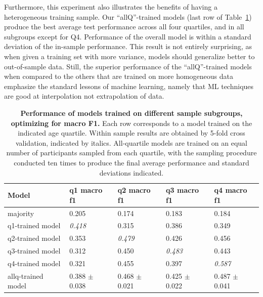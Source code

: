 \documentclass[acmlarge]{acmart}
\begin{document}
Furthermore, this experiment also illustrates the benefits of having a heterogeneous training sample. Our ``allQ''-trained models (last row of Table~\ref{tab:subpop_perf_macro}) produce the best average test performance across all four quartiles, and in all subgroups except for Q4. Performance of the overall model is within a standard deviation of the in-sample performance. This result is not entirely surprising, as when given a training set with more variance, models should generalize better to out-of-sample data. Still, the superior performance of the ``allQ''-trained models when compared to the others that are trained on more homogeneous data emphasize the standard lessons of machine learning, namely that ML techniques are good at interpolation not extrapolation of data.


\begin{table}[h]
    \centering
    \begin{tabular}{lllll}
    \toprule
    Model &  q1 macro f1 &  q2 macro f1 &  q3 macro f1 &  q4 macro f1 \\
    \midrule
    majority &        0.205 &        0.174 &        0.183 &        0.184 \\
    q1-trained model       &        \textit{0.418} &        0.315 &        0.386 &        0.349 \\
    q2-trained model       &        0.353 &        \textit{0.479} &        0.426 &        0.456 \\
    q3-trained model       &        0.312 &        0.450 &        \textit{0.483} &        0.443 \\
    q4-trained model       &        0.321 &        0.455 &        0.397 &        \textit{0.587} \\
    allq-trained model     &        0.388 $\pm$ 0.038 &        0.468 $\pm$ 0.021 &        0.425 $\pm$ 0.022 &        0.487 $\pm$ 0.041 \\
    \bottomrule
    \end{tabular}
    \caption{\textbf{Performance of models trained on different sample subgroups, optimizing for macro F1.} Each row corresponds to a model trained on the indicated age quartile. Within sample results are obtained by 5-fold cross validation, indicated by italics.
    All-quartile models are trained on an equal number of participants sampled from each quartile, with the sampling procedure conducted ten times to produce the final average performance and standard deviations indicated.}
    \label{tab:subpop_perf_macro}
\end{table}
\end{document}
